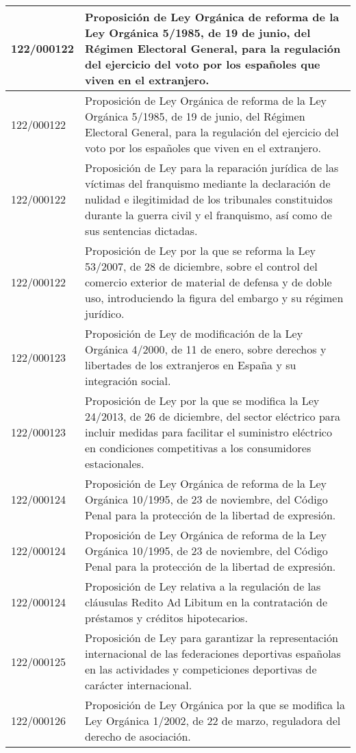 {\begin{table}[H]
\begin{center}
\begin{tabularx}{\linewidth}{| l | X |}
\hline
122/000122 & Proposición de Ley Orgánica de reforma de la Ley Orgánica 5/1985, de 19 de junio, del Régimen Electoral General, para la regulación del ejercicio del voto por los españoles que viven en el extranjero. \\
\hline
122/000122 & Proposición de Ley Orgánica de reforma de la Ley Orgánica 5/1985, de 19 de junio, del Régimen Electoral General, para la regulación del ejercicio del voto por los españoles que viven en el extranjero. \\
\hline
122/000122 & Proposición de Ley para la reparación jurídica de las víctimas del franquismo mediante la declaración de nulidad e ilegitimidad de los tribunales constituidos durante la guerra civil y el franquismo, así como de sus sentencias dictadas. \\
\hline
122/000122 & Proposición de Ley por la que se reforma la Ley 53/2007, de 28 de diciembre, sobre el control del comercio exterior de material de defensa y de doble uso, introduciendo la figura del embargo y su régimen jurídico. \\
\hline
122/000123 & Proposición de Ley de modificación de la Ley Orgánica 4/2000, de 11 de enero, sobre derechos y libertades de los extranjeros en España y su integración social. \\
\hline
122/000123 & Proposición de Ley por la que se modifica la Ley 24/2013, de 26 de diciembre, del sector eléctrico para incluir medidas para facilitar el suministro eléctrico en condiciones competitivas a los consumidores estacionales. \\
\hline
122/000124 & Proposición de Ley Orgánica de reforma de la Ley Orgánica 10/1995, de 23 de noviembre, del Código Penal para la protección de la libertad de expresión. \\
\hline
122/000124 & Proposición de Ley Orgánica de reforma de la Ley Orgánica 10/1995, de 23 de noviembre, del Código Penal para la protección de la libertad de expresión. \\
\hline
122/000124 & Proposición de Ley relativa a la regulación de las cláusulas Redito Ad Libitum en la contratación de préstamos y créditos hipotecarios. \\
\hline
122/000125 & Proposición de Ley para garantizar la representación internacional de las federaciones deportivas españolas en las actividades y competiciones deportivas de carácter internacional. \\
\hline
122/000126 & Proposición de Ley Orgánica por la que se modifica la Ley Orgánica 1/2002, de 22 de marzo, reguladora del derecho de asociación. \\

\end{tabularx}
\end{center}
\end{table}}
